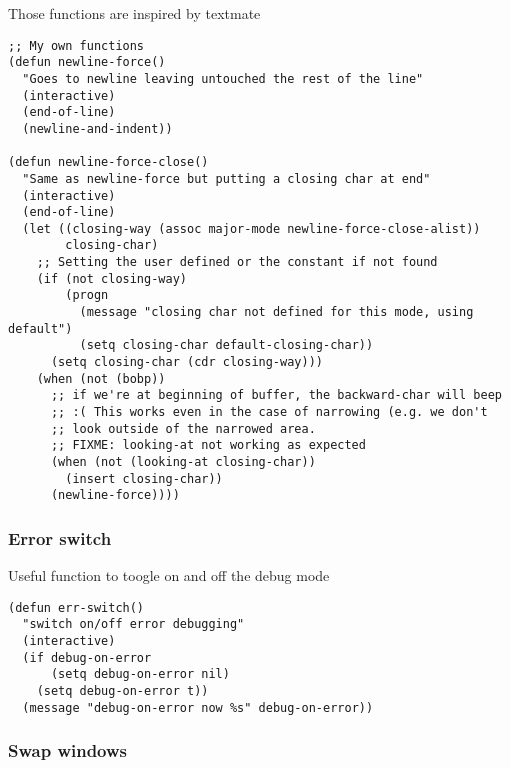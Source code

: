 \documentclass[11pt]{article}
\begin{document}
   Those functions are inspired by textmate
\begin{verbatim}
;; My own functions
(defun newline-force()
  "Goes to newline leaving untouched the rest of the line"
  (interactive)
  (end-of-line)
  (newline-and-indent))

(defun newline-force-close()
  "Same as newline-force but putting a closing char at end"
  (interactive)
  (end-of-line)
  (let ((closing-way (assoc major-mode newline-force-close-alist))
        closing-char)
    ;; Setting the user defined or the constant if not found
    (if (not closing-way)
        (progn
          (message "closing char not defined for this mode, using default")
          (setq closing-char default-closing-char))
      (setq closing-char (cdr closing-way)))
    (when (not (bobp))
      ;; if we're at beginning of buffer, the backward-char will beep
      ;; :( This works even in the case of narrowing (e.g. we don't
      ;; look outside of the narrowed area.
      ;; FIXME: looking-at not working as expected
      (when (not (looking-at closing-char))
        (insert closing-char))
      (newline-force))))
\end{verbatim}
\subsubsection{Error switch}
\label{sec-18.2.6}

    Useful function to toogle on and off the debug mode
\begin{verbatim}
(defun err-switch()
  "switch on/off error debugging"
  (interactive)
  (if debug-on-error
      (setq debug-on-error nil)
    (setq debug-on-error t))
  (message "debug-on-error now %s" debug-on-error))
\end{verbatim}
\subsubsection{Swap windows}
\label{sec-18.2.7}
\end{document}
